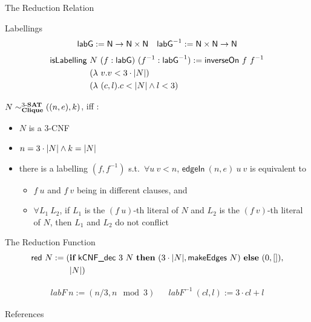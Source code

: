 \documentclass[11pt,usenames,dvipsnames,
  hyperref={pdfencoding=auto,psdextra}]{beamer}
\begin{document}
\begin{frame}[allowframebreaks]{The Reduction Relation}
  \begin{block}{Labellings}
 \begin{align*}
  \normalfont\textsf{labG} := \mathsf{N} \rightarrow \mathsf{N} \times \mathsf{N} && \normalfont\textsf{labG}^{-1} := \mathsf{N} \times \mathsf{N} \rightarrow \mathsf{N}
  \end{align*}
  \begin{align*}
    \normalfont\textsf{isLabelling}~&N~(f : \normalfont\textsf{labG})~(f^{-1} : \normalfont\textsf{labG}^{-1}) := \normalfont\textsf{inverseOn}~f~f^{-1}\\
  &(\lambda~v. v < 3 \cdot |N|)\\
  ~&(\lambda~(c, l). c < |N| \land l < 3) 
\end{align*}
  \end{block}

  \pagebreak

  $N \sim^{\text{3-\textbf{SAT}}}_{\textbf{Clique}} ((n, e), k)$, iff :
  \begin{itemize}
    \item $N$ is a 3-CNF
    \item $n = 3 \cdot |N| \land k = |N|$
    \item there is a labelling $(f, f^{-1})$ s.t.\ $\forall u~v < n$, $\textsf{edgeIn}~(n, e)~u~v$ is equivalent to 
      \begin{itemize}
        \item $f~u$ and $f~v$ being in different clauses, and
        \item $\forall L_1~L_2$, if $L_1$ is the $(f~u)$-th literal of $N$ and $L_2$ is the $(f~v)$-th literal of $N$, then $L_1$ and $L_2$ do not conflict
      \end{itemize}
  \end{itemize}
\end{frame}

\begin{frame}{The Reduction Function}
  \begin{align*}
    \textsf{red}~N := (&\textbf{if}~{\textsf{kCNF\_dec}~3~N}~\textbf{then}~{(3 \cdot |N|, \textsf{makeEdges}~N)}~\textbf{else}~{(0, [])}, \\
    &|N|)
  \end{align*}

  \begin{align*}
    \mathit{labF}~n := (n/3, n \mod 3) && \mathit{labF}^{-1}~(cl, l) := 3 \cdot cl + l
  \end{align*}
\end{frame}

\begin{frame}[allowframebreaks]{References}
  \nocite{Sipser:TheoryofComputation}
  
  {}
\end{frame}
\end{document}
